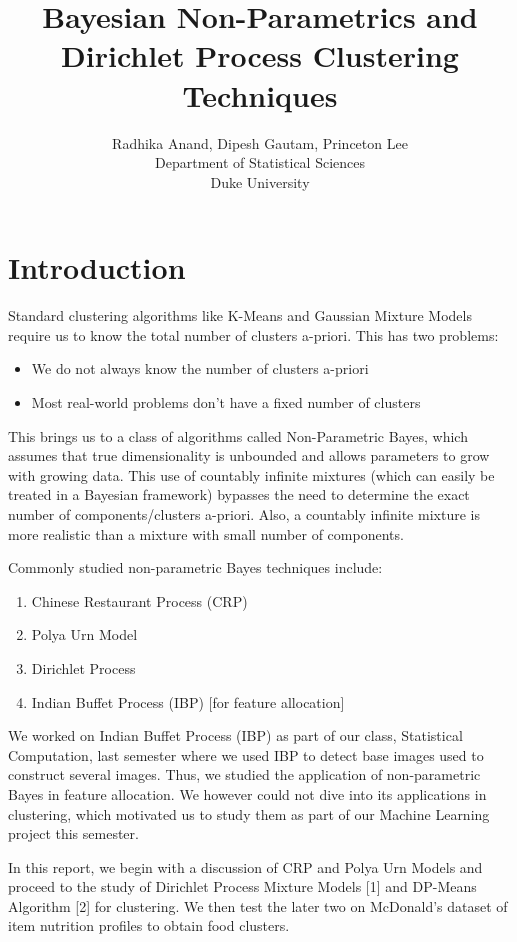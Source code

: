 \documentclass{article} %
\title{Bayesian Non-Parametrics and Dirichlet Process Clustering Techniques}
\author{
Radhika Anand, Dipesh Gautam, Princeton Lee\\
Department of Statistical Sciences\\
Duke University\\
}
\begin{document}
\maketitle

\section{Introduction}
Standard clustering algorithms like K-Means and Gaussian Mixture Models require us to know the total number of clusters a-priori. This has two problems:
\begin{itemize}
\item We do not always know the number of clusters a-priori
\item Most real-world problems don't have a fixed number of clusters
\end{itemize}
This brings us to a class of algorithms called Non-Parametric Bayes, which assumes that true dimensionality is unbounded and allows parameters to grow with growing data. This use of countably infinite mixtures (which can easily be treated in a Bayesian framework) bypasses the need to determine the exact number of components/clusters a-priori. Also, a countably infinite mixture is more realistic than a mixture with small number of components.

Commonly studied non-parametric Bayes techniques include:
\begin{enumerate}
\item Chinese Restaurant Process (CRP)
\item Polya Urn Model
\item Dirichlet Process
\item Indian Buffet Process (IBP) [for feature allocation]
\end{enumerate}

We worked on Indian Buffet Process (IBP) as part of our class, Statistical Computation, last semester where we used IBP to detect base images used to construct several images. Thus, we studied the application of non-parametric Bayes in feature allocation. We however could not dive into its applications in clustering, which motivated us to study them as part of our Machine Learning project this semester.

In this report, we begin with a discussion of CRP and Polya Urn Models and proceed to the study of Dirichlet Process Mixture Models [1] and DP-Means Algorithm [2] for clustering. We then test the later two on McDonald's dataset of item nutrition profiles to obtain food clusters.
\end{document}
